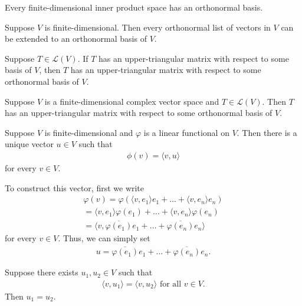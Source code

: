 \documentclass{memoir}
\begin{document}
\begin{cor}
	Every finite-dimensional inner product space has an orthonormal basis.
\end{cor}
\begin{cor}
	Suppose $V$ is finite-dimensional. Then every orthonormal list of vectors in $V$ can be extended to an orthonormal basis of $V$.
\end{cor}
\begin{lemma}
	Suppose $T \in \mathcal{L}(V)$. If $T$ has an upper-triangular matrix with respect to some basis of $V$, then $T$ has an upper-triangular matrix with respect to some orthonormal basis of $V$.
\end{lemma}
\begin{thm}
	Suppose $V$ is a finite-dimensional complex vector space and $T \in \mathcal{L}(V)$. Then $T$ has an upper-triangular matrix with respect to some orthonormal basis of $V$.
\end{thm}
\begin{thm}
	Suppose $V$ is finite-dimensional and $\varphi $ is a linear functional on $V$. Then there is a unique vector $u\in V$ such that
	 \begin{align*}
		 \phi(v) = \langle v, u \rangle 
	\end{align*}
	for every $v \in V$.
\end{thm}
To construct this vector, first we write
\begin{align*}
	\varphi(v) = \varphi\left( \langle v, e_1 \rangle e_1 + \ldots + \langle v, e_n \rangle e_n \right) \\
	= \langle v, e_1 \rangle \varphi(e_1) + \ldots + \langle v, e_n \rangle \varphi(e_n) \\
	= \langle v, \overline{\varphi(e_1)}e_1 + \ldots + \overline{\varphi(e_n)}e_n \rangle 
\end{align*}
for every \(v \in V\). Thus, we can simply set
\begin{align*}
	u = \overline{\varphi(e_1)}e_1 + \ldots + \overline{\varphi(e_n)}e_n.
\end{align*}
\begin{lemma}
	Suppose there exists $ u_1,u_2 \in V$ such that
	\begin{align*}
		 \langle v, u_1 \rangle = \langle v, u_2 \rangle \text{ for all } v \in V.
	\end{align*}
	Then $u_1 = u_2$.
\end{lemma}
\end{document}
